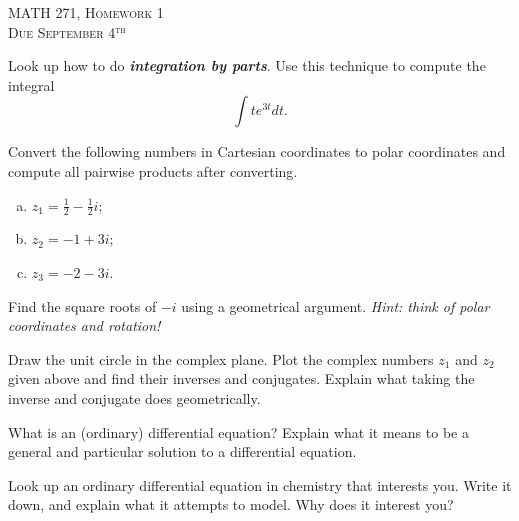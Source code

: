 \documentclass[12pt]{article} %
\begin{document}
\begin{center}
   \textsc{\large MATH 271, Homework 1}\\
   \textsc{Due September 4$^\textrm{th}$}
\end{center}
\vspace{.5cm}

\begin{problem}
    Look up how to do \textbf{\emph{integration by parts}}. Use this technique to compute the integral
    \[
        \int t e^{3t}dt.
    \]
    
\end{problem}

\begin{problem}
Convert the following numbers in Cartesian coordinates to polar coordinates and compute all pairwise products after converting.
\begin{enumerate}[(a)]
    \item $z_1=\frac{1}{2}-\frac{1}{2}i$;
    \item $z_2=-1+3i$;
    \item $z_3=-2-3i$.
\end{enumerate}
\end{problem}

\begin{problem}
Find the square roots of $-i$ using a geometrical argument. \emph{Hint: think of polar coordinates and rotation!}
\end{problem}

\begin{problem}
Draw the unit circle in the complex plane. Plot the complex numbers $z_1$ and $z_2$ given above and find their inverses and conjugates. Explain what taking the inverse and conjugate does geometrically.
\end{problem}

\begin{problem}
    What is an (ordinary) differential equation? Explain what it means to be a general and particular solution to a differential equation.
\end{problem}

\begin{problem}
    Look up an ordinary differential equation in chemistry that interests you.  Write it down, and explain what it attempts to model. Why does it interest you?
\end{problem}
\end{document}
